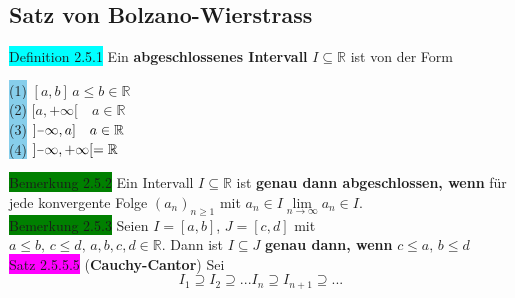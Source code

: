\documentclass[landscape, 10pt]{article}
\newcommand{\R}{\mathbb{R}}
\begin{document}
\begin{multicols}{3}
       \subsection{Satz von Bolzano-Wierstrass}
              \colorbox{cyan}{Definition 2.5.1} 
                     Ein \textbf{abgeschlossenes Intervall} 
                     \textcolor{NavyBlue}{$I\subseteq\R$} 
                     ist von der Form
                     \begin{multicols}{2} %
                     \colorbox{SkyBlue}{(1)} 
                            $[a,b]\, a\leqslant b\in\R$\\
                     \colorbox{SkyBlue}{(2)}
                            $[a,+\infty[\quad a\in\R$\\
                     \colorbox{SkyBlue}{(3)}
                            $]\scalebox{0.75}[1.0]{\(-\)}\infty,a]\quad a\in\R$\\
                     \colorbox{SkyBlue}{(4)} 
                            $]\scalebox{0.75}[1.0]{\(-\)}\infty,+\infty[=\R$
                     \end{multicols}
              \colorbox{green}{Bemerkung 2.5.2} 
                     Ein Intervall 
                     \textcolor{NavyBlue}{$I\subseteq\R$} 
                     ist \textbf{genau dann abgeschlossen, 
                     wenn} für jede konvergente Folge 
                     \textcolor{NavyBlue}{$(a_n)_{n\geqslant1}$}
                     mit \textcolor{NavyBlue}{
                     $a_n\in I$\quad$\lim\limits_{n\to\infty}a_n\in I$}.\\
              \colorbox{green}{Bemerkung 2.5.3}
                     Seien \textcolor{NavyBlue}{$I=[a,b]$},
                     \textcolor{NavyBlue}{$J=[c,d]$} mit \\
                     \textcolor{NavyBlue}{
                     $a\leqslant b,\,c\leqslant d,\,a,b,c,d\in\R$}. 
                     Dann ist 
                     \textcolor{NavyBlue}{$I\subseteq J$} 
                     \textbf{genau dann, wenn} \textcolor{NavyBlue}{
                     $c\leqslant a,\,b\leqslant d$}\\
              \colorbox{magenta}{Satz 2.5.5.5} 
              (\textbf{Cauchy-Cantor}) 
                     Sei
                     \begin{equation*}
                            I_1\supseteq I_2\supseteq ...I_n\supseteq 
                            I_{n+1}\supseteq ...
                     \end{equation*}

\end{multicols}
\end{document}
